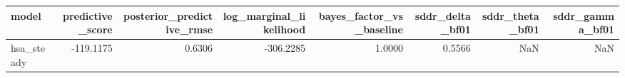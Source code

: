 \begin{tabular}{lrrrrrrr}
\toprule
model & predictive\_score & posterior\_predictive\_rmse & log\_marginal\_likelihood & bayes\_factor\_vs\_baseline & sddr\_delta\_bf01 & sddr\_theta\_bf01 & sddr\_gamma\_bf01 \\
\midrule
hsa\_steady & -119.1175 & 0.6306 & -306.2285 & 1.0000 & 0.5566 & NaN & NaN \\
\bottomrule
\end{tabular}

